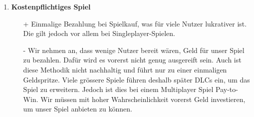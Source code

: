 \begin{itemize}
\begin{enumerate}
\begin{itemize}
        \end{itemize}
        \item \textbf{Kostenpflichtiges Spiel}
        \begin{itemize}
            \item[+] Einmalige Bezahlung bei Spielkauf, was für viele Nutzer lukrativer ist. Die gilt jedoch vor allem bei \gls{Singleplayer}-Spielen.
            \item[-] Wir nehmen an, dass wenige Nutzer bereit wären, Geld für unser Spiel zu bezahlen.
                    Dafür wird es vorerst nicht genug ausgereift sein.
                    Auch ist diese Methodik nicht nachhaltig und führt nur zu einer einmaligen Geldspritze.
                    Viele grössere Spiele führen deshalb später
                    \glspl{DLC} ein, um das Spiel zu erweitern.
                    Jedoch ist dies bei einem Multiplayer Spiel Pay-to-Win.
                    Wir müssen mit hoher Wahrscheinlichkeit vorerst Geld investieren, um unser Spiel anbieten zu können.
        \end{itemize}
    \end{enumerate}
\end{itemize}


